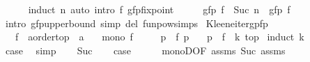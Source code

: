 \begin{isabellebody}
\ \ \ \ \isamarkupfalse%
\ {\isacharparenleft}{\kern0pt}induct\ n{\isacharparenright}{\kern0pt}\ {\isacharparenleft}{\kern0pt}auto\ intro{\isacharcolon}{\kern0pt}\ f\ gfp{\isacharunderscore}{\kern0pt}fixpoint{\isacharparenright}{\kern0pt}\isanewline
\ \ \isamarkupfalse%
\ \isamarkupfalse%
\ {\isachardoublequoteopen}gfp\ {\isacharparenleft}{\kern0pt}f\ {\isacharcircum}{\kern0pt}{\isacharcircum}{\kern0pt}\ Suc\ n{\isacharparenright}{\kern0pt}\ {\isasymge}\ gfp\ f{\isachardoublequoteclose}\isanewline
\ \ \ \ \isamarkupfalse%
\ {\isacharparenleft}{\kern0pt}intro\ gfp{\isacharunderscore}{\kern0pt}upperbound{\isacharparenright}{\kern0pt}\ {\isacharparenleft}{\kern0pt}simp\ del{\isacharcolon}{\kern0pt}\ funpow{\isachardot}{\kern0pt}simps{\isacharparenright}{\kern0pt}\isanewline
{}\isamarkupfalse%
%
\endisatagproof
{\isafoldproof}%
%
\isadelimproof
\isanewline
%
\endisadelimproof
\isanewline
{}\isamarkupfalse%
\ Kleene{\isacharunderscore}{\kern0pt}iter{\isacharunderscore}{\kern0pt}gpfp{\isacharcolon}{\kern0pt}\isanewline
\ \ \ f\ {\isacharcolon}{\kern0pt}{\isacharcolon}{\kern0pt}\ {\isachardoublequoteopen}{\isacharprime}{\kern0pt}a{\isacharcolon}{\kern0pt}{\isacharcolon}{\kern0pt}order{\isacharunderscore}{\kern0pt}top\ {\isasymRightarrow}\ {\isacharprime}{\kern0pt}a{\isachardoublequoteclose}\isanewline
\ \ \ {\isachardoublequoteopen}mono\ f{\isachardoublequoteclose}\isanewline
\ \ \ \ \ {\isachardoublequoteopen}p\ {\isasymle}\ f\ p{\isachardoublequoteclose}\isanewline
\ \ \ {\isachardoublequoteopen}p\ {\isasymle}\ {\isacharparenleft}{\kern0pt}f\ {\isacharcircum}{\kern0pt}{\isacharcircum}{\kern0pt}\ k{\isacharparenright}{\kern0pt}\ top{\isachardoublequoteclose}\isanewline
%
\isadelimproof
%
\endisadelimproof
%
\isatagproof
{}\isamarkupfalse%
\ {\isacharparenleft}{\kern0pt}induct\ k{\isacharparenright}{\kern0pt}\isanewline
\ \ \isamarkupfalse%
\ {}\isanewline
\ \ \isamarkupfalse%
\ {\isacharquery}{\kern0pt}case\ \isamarkupfalse%
\ simp\isanewline
{}\isamarkupfalse%
\isanewline
\ \ \isamarkupfalse%
\ Suc\isanewline
\ \ \isamarkupfalse%
\ {\isacharquery}{\kern0pt}case\isanewline
\ \ \ \ \isamarkupfalse%
\ monoD{\isacharbrackleft}{\kern0pt}OF\ assms{\isacharparenleft}{\kern0pt}{}{\isacharparenright}{\kern0pt}\ Suc{\isacharbrackright}{\kern0pt}\ assms{\isacharparenleft}{\kern0pt}{}{\isacharparenright}{\kern0pt}\ \isamarkupfalse%

\end{isabellebody}

